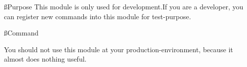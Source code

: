 
\ss{Purpose}
This module is only used for development.If you are a developer, you can register new commands into this module for test-purpose.

\ss{Command}

\begin{warn}{}
    You should not use this module at your production-environment, because it almost does nothing useful.
\end{warn}

